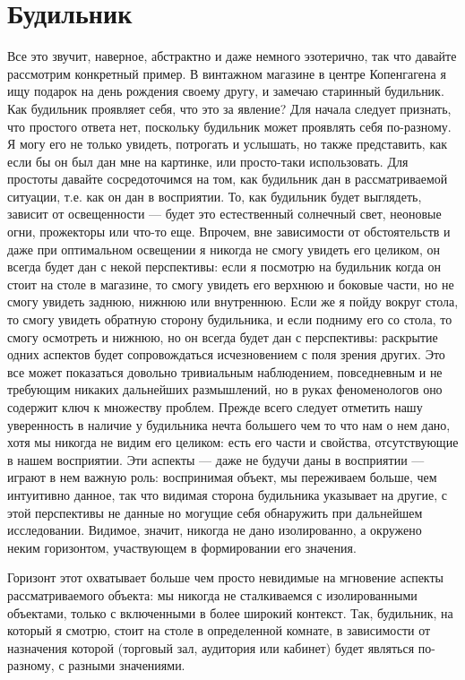 \documentclass[11pt]{book}
\begin{document}
\section{Будильник}

Все это звучит, наверное, абстрактно и даже немного эзотерично, так что давайте рассмотрим конкретный пример. В винтажном магазине в центре Копенгагена я ищу подарок на день рождения своему другу, и замечаю старинный будильник. Как будильник проявляет себя, что это за явление? Для начала следует признать, что простого ответа нет, поскольку будильник может проявлять себя по-разному. Я могу его не только увидеть, потрогать и услышать, но также представить, как если бы он был дан мне на картинке, или просто-таки использовать. Для простоты давайте сосредоточимся на том, как будильник дан в рассматриваемой ситуации, т.е. как он дан в восприятии. То, как будильник будет выглядеть, зависит от освещенности --- будет это естественный солнечный свет, неоновые огни, прожекторы или что-то еще. Впрочем, вне зависимости от обстоятельств и даже при оптимальном освещении я никогда не смогу увидеть его целиком, он всегда будет дан с некой перспективы: если я посмотрю на будильник когда он стоит на столе в магазине, то смогу увидеть его верхнюю и боковые части, но не смогу увидеть заднюю, нижнюю или внутреннюю. Если же я пойду вокруг стола, то смогу увидеть обратную сторону будильника, и если подниму его со стола, то смогу осмотреть и нижнюю, но он всегда будет дан с перспективы: раскрытие одних аспектов будет сопровождаться исчезновением с поля зрения других. Это все может показаться довольно тривиальным наблюдением, повседневным и не требующим никаких дальнейших размышлений, но в руках феноменологов оно содержит ключ к множеству проблем. Прежде всего следует отметить нашу уверенность в наличие у будильника нечта большего чем то что нам о нем дано, хотя мы никогда не видим его целиком: есть его части и свойства, отсутствующие в нашем восприятии. Эти аспекты --- даже не будучи даны в восприятии --- играют в нем важную роль: воспринимая объект, мы переживаем больше, чем интуитивно данное, так что видимая сторона будильника указывает на другие, с этой перспективы не данные но могущие себя обнаружить при дальнейшем исследовании. Видимое, значит, никогда не дано изолированно, а окружено неким горизонтом, участвующем в формировании его значения.

Горизонт этот охватывает больше чем просто невидимые на мгновение аспекты рассматриваемого объекта: мы никогда не сталкиваемся с изолированными объектами, только с включенными в более широкий контекст. Так, будильник, на который я смотрю, стоит на столе в определенной комнате, в зависимости от назначения которой (торговый зал, аудитория или кабинет) будет являться по-разному, с разными значениями.
\end{document}
